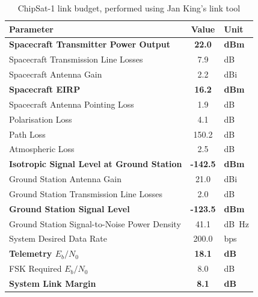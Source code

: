 \documentclass[a4paper,nobib,justified,final]{tufte-book}
\begin{document}
\begin{table}
	\newcommand{\specialcell}[1]{\color{MaterialPink800}\bfseries#1}
    \begin{tabular}{l S[table-format=4.1,detect-weight=true,detect-inline-weight=math] l}
        \toprule
        \textbf{Parameter} & \textbf{Value} & \textbf{Unit} \\
        \midrule
        \textbf{Spacecraft Transmitter Power Output} & \specialcell{22.0} & \specialcell{\unit{dBm}} \\
        Spacecraft Transmission Line Losses & 7.9 & {\unit{dB}} \\
        Spacecraft Antenna Gain & 2.2 & {\unit{dBi}} \\
        \textbf{Spacecraft \acs{EIRP}} & \specialcell{16.2} & \specialcell{\unit{dBm}} \\
        \midrule
        Spacecraft Antenna Pointing Loss & 1.9 & {\unit{dB}} \\
        Polarisation Loss & 4.1 & {\unit{dB}} \\
        Path Loss & 150.2 & {\unit{dB}} \\
        Atmospheric Loss & 2.5 & {\unit{dB}} \\
        \textbf{Isotropic Signal Level at Ground Station} & \specialcell{-142.5} & \specialcell{\unit{dBm}} \\
        \midrule
        Ground Station Antenna Gain & 21.0 & {\unit{dBi}} \\
        Ground Station Transmission Line Losses & 2.0 & {\unit{dB}} \\
        \textbf{Ground Station Signal Level} & \specialcell{-123.5} & \specialcell{\unit{dBm}} \\
        Ground Station Signal-to-Noise Power Density & 41.1 & {\unit{\deci\bel\hertz}} \\
        System Desired Data Rate & 200.0 & {\unit{bps}} \\
        \textbf{Telemetry \(E_b/N_0\)} & \specialcell{18.1} & \specialcell{\unit{dB}} \\
        FSK Required \(E_b/N_0\) & 8.0 & {\unit{dB}} \\
        \textbf{System Link Margin} & \specialcell{8.1} & \specialcell{\unit{dB}} \\
        \bottomrule
    \end{tabular}
	\caption[ChipSat-1 link budget]{ChipSat-1 link budget, performed using Jan King's link tool \autocite{JanKingLink}}
	\label{c:chipsat_link_budget}
\end{table}
\end{document}
